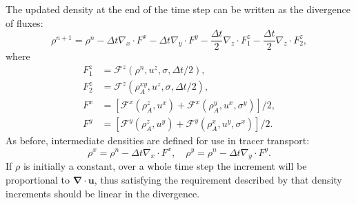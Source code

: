\documentclass{ametsocV6.1}
\begin{document}
The updated density at the end of the time step can be written as the divergence of fluxes:
\begin{equation}
    \rho^{n+1} = \rho^n - \Delta{t}\nabla_x \cdot F^x  - \Delta{t}\nabla_y \cdot F^y  - \frac{\Delta{t}}{2}\nabla_z \cdot F_1^z - \frac{\Delta{t}}{2}\nabla_z \cdot F_2^z,
\end{equation}
where
\begin{subequations}
\begin{align}
F_1^z & = \mathcal{F}^z(\rho^n,u^z,\sigma,\Delta{t}/2), \\
F_2^z & = \mathcal{F}^z(\rho^{xy}_A,u^z,\sigma,\Delta{t}/2), \\
F^x & = \left[ \mathcal{F}^x(\rho_A^z, u^x) + \mathcal{F}^x(\rho^y_A, u^x, \sigma^y) \right]/2, \\
F^y & = \left[ \mathcal{F}^y(\rho_A^z, u^y) + \mathcal{F}^y(\rho^x_A, u^y, \sigma^x)\right]/2.
\end{align}
\end{subequations}
As before, intermediate densities are defined for use in tracer transport:
\begin{equation}
\rho^x = \rho^{n} - \Delta{t} \nabla_x\cdot F^x, \quad
\rho^y = \rho^{n} - \Delta{t} \nabla_y\cdot F^y. 
\end{equation}
If $\rho$ is initially a constant, over a whole time step the increment will be proportional to $\bm{\nabla\cdot u}$, thus satisfying the requirement described by \citet{melvin2024mixed} that density increments should be linear in the divergence.
\end{document}
